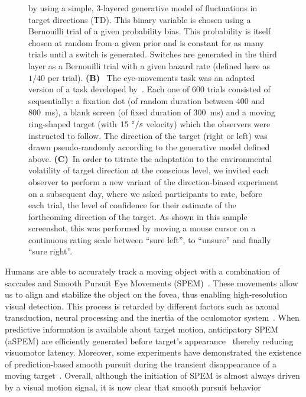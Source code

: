 \documentclass[12pt,english]{article}%
\newcommand{\ms}{\si{\milli\second}}%
\newcommand{\citep}[1]{\parencite{#1}}
\newcommand{\citet}[1]{\textcite{#1}}
\begin{document}
\begin{figure}
{by using a simple, 3-layered generative model of fluctuations in target directions (TD).
This binary variable is chosen using a Bernouilli trial of a given probability bias.
This probability is itself chosen at random from a given prior 
and is constant for as many trials until a switch is generated.
Switches are generated in the third layer as a Bernouilli trial 
with a given hazard rate (defined here as $1/40$ per trial).
\textbf{(B)}~
The eye-movements task was an adapted version of a task developed by~\citet{Montagnini2010}. 
Each one of $600$ trials consisted of sequentially:
a fixation dot (of random duration between $400$ and $800$~\ms),
a blank screen (of fixed duration of  $300$~\ms) and
a moving ring-shaped target (with $15~\degree/s$ velocity) which the observers were instructed to follow.
The direction of the target (right or left) was drawn pseudo-randomly
according to the generative model defined above. 
\textbf{(C)}~In order to titrate the adaptation 
to the environmental volatility of target direction at the conscious level,
we invited each observer to perform a new variant of the direction-biased experiment on a subsequent day,
where we asked participants to rate, before each trial, the level of confidence
for their estimate of the forthcoming direction of the target.
As shown in this sample screenshot,
this was performed by moving a mouse cursor on a continuous rating scale
between ``sure left'', to ``unsure'' and finally ``sure right''.
}
\label{fig:intro}
\end{figure}
Humans are able to accurately track a moving object
with a combination of saccades and
Smooth Pursuit Eye Movements (SPEM)~\citep{ref}.
These movements allow us to align and
stabilize the object on the fovea,
thus enabling high-resolution visual detection.
This process is retarded by different factors such as axonal transduction,
neural processing and the inertia of the oculomotor system~\citep{Krauzlis89}.
When predictive information is available about target motion,
anticipatory SPEM (aSPEM) are
efficiently generated before target's appearance~\citep{Westheimer1954, Kowler1979a, Kowler1979b} thereby reducing visuomotor latency.
Moreover, some experiments have demonstrated the existence
of prediction-based smooth pursuit during
the transient disappearance of a moving target~\citep{Badler2006,BeckerFuchs1985}.
Overall, although the initiation of SPEM is almost always driven by a visual motion signal, it is now clear that smooth pursuit behavior
\end{document}

